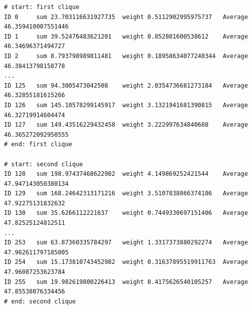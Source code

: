 \begin{lstlisting}[caption=Snippet of simulation outcomes - ATPPS: Experiment 2, captionpos=b, label=lst:exampleROCOutcomes]
# start: first clique
ID 0	 sum 23.703116631927735	 weight 0.5112902995975737	 Average 46.359410007551446
ID 1	 sum 39.52476483621201	 weight 0.852801600538612	 Average 46.34696371494727
ID 2	 sum 8.793798989811481	 weight 0.18958634077240344	 Average 46.38413798158778
...
ID 125	 sum 94.3005473042508	 weight 2.0354736681273184	 Average 46.32855181615266
ID 126	 sum 145.10578299145917	 weight 3.1321941681390815	 Average 46.32719914604474
ID 127	 sum 149.43516229432458	 weight 3.222997634840688	 Average 46.365272092950555
# end: first clique

# start: second clique
ID 128	 sum 198.97437468622982	 weight 4.149869252421544	 Average 47.947143050380134
ID 129	 sum 168.24642313171216	 weight 3.5107838866374186	 Average 47.92275131832632
ID 130	 sum 35.6266112221637	 weight 0.7449330697151406	 Average 47.82525124812511
...
ID 253	 sum 63.87360335784297	 weight 1.3317373880292274	 Average 47.962611797185005
ID 254	 sum 15.173810743452982	 weight 0.31637895519911763	 Average 47.96087253623784
ID 255	 sum 19.982619800226413	 weight 0.4175626540105257	 Average 47.85538076334456
# end: second clique
\end{lstlisting}